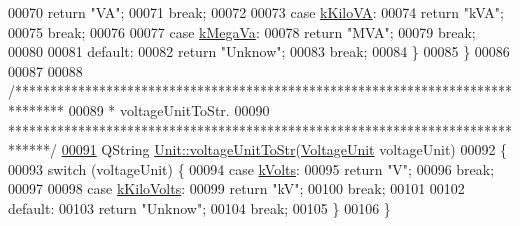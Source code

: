 \begin{DoxyCode}
00070     \textcolor{keywordflow}{return} \textcolor{stringliteral}{"VA"};
00071     \textcolor{keywordflow}{break};
00072 
00073   \textcolor{keywordflow}{case} \hyperlink{class_unit_ace265ae255370ccacfd5370337572c3bac9e5154522fbb810d7aed75c3ff47cb2}{kKiloVA}:
00074     \textcolor{keywordflow}{return} \textcolor{stringliteral}{"kVA"};
00075     \textcolor{keywordflow}{break};
00076 
00077   \textcolor{keywordflow}{case} \hyperlink{class_unit_ace265ae255370ccacfd5370337572c3ba6039da0ed20f8bee64305bab8bdec365}{kMegaVa}:
00078     \textcolor{keywordflow}{return} \textcolor{stringliteral}{"MVA"};
00079     \textcolor{keywordflow}{break};
00080 
00081   \textcolor{keywordflow}{default}:
00082     \textcolor{keywordflow}{return} \textcolor{stringliteral}{"Unknow"};
00083     \textcolor{keywordflow}{break};
00084   \}
00085 \}
00086 
00087 
00088 \textcolor{comment}{/*******************************************************************************}
00089 \textcolor{comment}{ * voltageUnitToStr.}
00090 \textcolor{comment}{ ******************************************************************************/}
\hypertarget{customtypes_8cpp_source_l00091}{}\hyperlink{class_unit_a7fa103c31f9f069961b35b6371ff0c0a}{00091} QString \hyperlink{class_unit_a7fa103c31f9f069961b35b6371ff0c0a}{Unit::voltageUnitToStr}(\hyperlink{class_unit_a55b07dfa9457e1eca2c7194fe0cfc3c1}{VoltageUnit} voltageUnit)
00092 \{
00093   \textcolor{keywordflow}{switch} (voltageUnit) \{
00094   \textcolor{keywordflow}{case} \hyperlink{class_unit_a55b07dfa9457e1eca2c7194fe0cfc3c1aa54b2473993a702a3923525765bd6e4c}{kVolts}:
00095     \textcolor{keywordflow}{return} \textcolor{stringliteral}{"V"};
00096     \textcolor{keywordflow}{break};
00097 
00098   \textcolor{keywordflow}{case} \hyperlink{class_unit_a55b07dfa9457e1eca2c7194fe0cfc3c1a35a201a658c2cd89766787c657e9a54d}{kKiloVolts}:
00099     \textcolor{keywordflow}{return} \textcolor{stringliteral}{"kV"};
00100     \textcolor{keywordflow}{break};
00101 
00102   \textcolor{keywordflow}{default}:
00103     \textcolor{keywordflow}{return} \textcolor{stringliteral}{"Unknow"};
00104     \textcolor{keywordflow}{break};
00105   \}
00106 \}
\end{DoxyCode}
